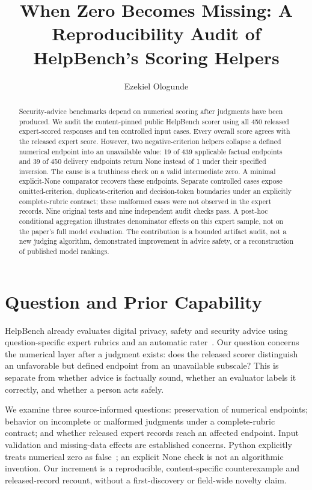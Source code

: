 \documentclass[sigconf,nonacm]{acmart}
\title{When Zero Becomes Missing: A Reproducibility Audit of HelpBench's Scoring Helpers}
\author{Ezekiel Ologunde}
\begin{document}
\begin{abstract}
Security-advice benchmarks depend on numerical scoring after judgments have been produced. We audit the content-pinned public HelpBench scorer using all 450 released expert-scored responses and ten controlled input cases. Every overall score agrees with the released expert score. However, two negative-criterion helpers collapse a defined numerical endpoint into an unavailable value: 19 of 439 applicable factual endpoints and 39 of 450 delivery endpoints return None instead of 1 under their specified inversion. The cause is a truthiness check on a valid intermediate zero. A minimal explicit-None comparator recovers these endpoints. Separate controlled cases expose omitted-criterion, duplicate-criterion and decision-token boundaries under an explicitly complete-rubric contract; these malformed cases were not observed in the expert records. Nine original tests and nine independent audit checks pass. A post-hoc conditional aggregation illustrates denominator effects on this expert sample, not on the paper's full model evaluation. The contribution is a bounded artifact audit, not a new judging algorithm, demonstrated improvement in advice safety, or a reconstruction of published model rankings.
\end{abstract}
\maketitle

\section{Question and Prior Capability}
HelpBench already evaluates digital privacy, safety and security advice using question-specific expert rubrics and an automatic rater~\cite{helpbench}. Our question concerns the numerical layer after a judgment exists: does the released scorer distinguish an unfavorable but defined endpoint from an unavailable subscale? This is separate from whether advice is factually sound, whether an evaluator labels it correctly, and whether a person acts safely.

We examine three source-informed questions: preservation of numerical endpoints; behavior on incomplete or malformed judgments under a complete-rubric contract; and whether released expert records reach an affected endpoint. Input validation and missing-data effects are established concerns. Python explicitly treats numerical zero as false~\cite{python}; an explicit None check is not an algorithmic invention. Our increment is a reproducible, content-specific counterexample and released-record recount, without a first-discovery or field-wide novelty claim.
\end{document}
